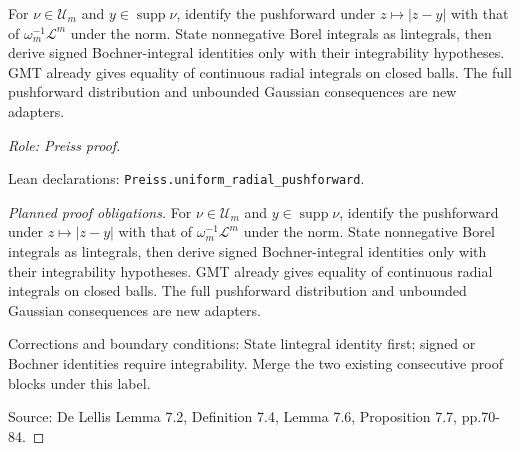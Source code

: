\begin{lemma}
\label{lem:radial}




For $\nu\in\mathcal U_m$ and $y\in\operatorname{supp}\nu$, identify the
pushforward under $z\mapsto|z-y|$ with that of
$\omega_m^{-1}\mathcal L^m$ under the norm. State nonnegative Borel integrals
as lintegrals, then derive signed Bochner-integral identities only with their
integrability hypotheses. GMT already gives equality of continuous radial
integrals on closed balls. The full pushforward distribution and unbounded
Gaussian consequences are new adapters.
\par\emph{Role: Preiss proof.}
\par Lean declarations: \texttt{Preiss.uniform\_radial\_pushforward}.
\end{lemma}
\begin{proof}[Planned proof obligations]

For $\nu\in\mathcal U_m$ and $y\in\operatorname{supp}\nu$, identify the
pushforward under $z\mapsto|z-y|$ with that of
$\omega_m^{-1}\mathcal L^m$ under the norm. State nonnegative Borel integrals
as lintegrals, then derive signed Bochner-integral identities only with their
integrability hypotheses. GMT already gives equality of continuous radial
integrals on closed balls. The full pushforward distribution and unbounded
Gaussian consequences are new adapters.
\par Corrections and boundary conditions: State lintegral identity first; signed or Bochner identities require integrability. Merge the two existing consecutive proof blocks under this label.
\par Source: De Lellis Lemma 7.2, Definition 7.4, Lemma 7.6, Proposition 7.7, pp.70-84.
\end{proof}

